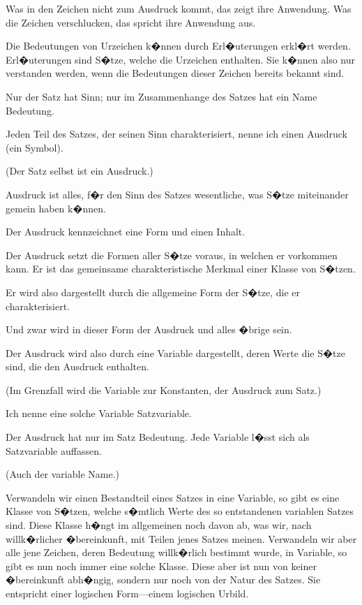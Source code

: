 {Was in den Zeichen nicht zum Ausdruck kommt,
das zeigt ihre Anwendung. Was die Zeichen
verschlucken, das spricht ihre Anwendung aus.}


{Die Bedeutungen von Urzeichen k�nnen durch
Erl�uterungen erkl�rt werden. Erl�uterungen
sind S�tze, welche die Urzeichen enthalten. Sie
k�nnen also nur verstanden werden, wenn die
Bedeutungen dieser Zeichen bereits bekannt sind.}


{Nur der Satz hat Sinn; nur im Zusammenhange
des Satzes hat ein Name Bedeutung.}


{Jeden Teil des Satzes, der seinen Sinn charakterisiert,
nenne ich einen Ausdruck (ein Symbol).

(Der Satz selbst ist ein Ausdruck.)

Ausdruck ist alles, f�r den Sinn des Satzes
wesentliche, was S�tze miteinander gemein haben
k�nnen.

Der Ausdruck kennzeichnet eine Form und
einen Inhalt.}


{Der Ausdruck setzt die Formen aller S�tze
voraus, in welchen er vorkommen kann. Er ist
das gemeinsame charakteristische Merkmal einer
Klasse von S�tzen.}


{Er wird also dargestellt durch die allgemeine
Form der S�tze, die er charakterisiert.

Und zwar wird in dieser Form der Ausdruck
 und alles �brige  sein.}


{Der Ausdruck wird also durch eine Variable
\enlargethispage{6pt} %
dargestellt, deren Werte die S�tze sind, die den
Ausdruck enthalten.

(Im Grenzfall wird die Variable zur Konstanten,
der Ausdruck zum Satz.)

Ich nenne eine solche Variable \glqq{}Satzvariable\grqq{}.}


{Der Ausdruck hat nur im Satz Bedeutung.
Jede Variable l�sst sich als Satzvariable auffassen.

(Auch der variable Name.)}


{Verwandeln wir einen Bestandteil eines Satzes
in eine Variable, so gibt es eine Klasse von S�tzen,
welche s�mtlich Werte des so entstandenen variablen
Satzes sind. Diese Klasse h�ngt im allgemeinen
noch davon ab, was wir, nach willk�rlicher
�bereinkunft, mit Teilen jenes Satzes meinen.
Verwandeln wir aber alle jene Zeichen, deren
Bedeutung willk�rlich bestimmt wurde, in Variable,
so gibt es nun noch immer eine solche Klasse.
Diese aber ist nun von keiner �bereinkunft
abh�ngig, sondern nur noch von der Natur des
Satzes. Sie entspricht einer logischen Form---einem
logischen Urbild.}


